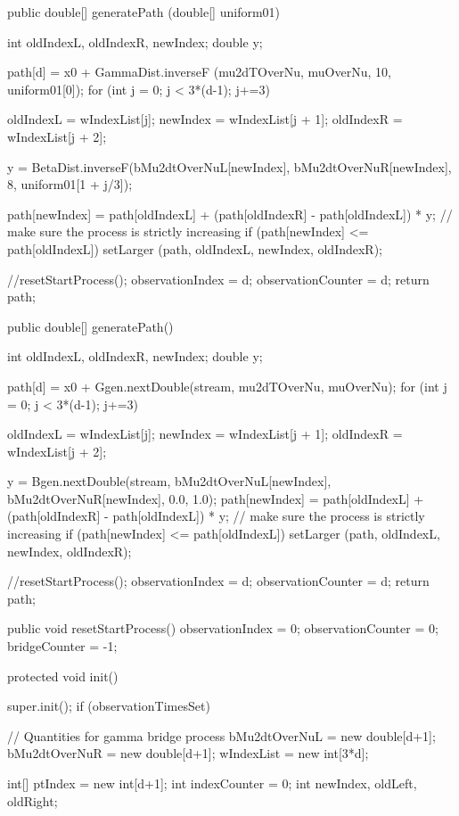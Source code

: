 \begin{code}
\begin{hide}
   public double[] generatePath (double[] uniform01) {
        int oldIndexL, oldIndexR, newIndex;
        double y;

        path[d] = x0 + GammaDist.inverseF (mu2dTOverNu, muOverNu, 10, uniform01[0]);
        for (int j = 0; j < 3*(d-1); j+=3) {
            oldIndexL   = wIndexList[j];
            newIndex    = wIndexList[j + 1];
            oldIndexR   = wIndexList[j + 2];

            y = BetaDist.inverseF(bMu2dtOverNuL[newIndex], bMu2dtOverNuR[newIndex], 8, uniform01[1 + j/3]);

            path[newIndex] = path[oldIndexL] +
              (path[oldIndexR] - path[oldIndexL]) * y;
            // make sure the process is strictly increasing
            if (path[newIndex] <= path[oldIndexL])
               setLarger (path, oldIndexL, newIndex, oldIndexR);
        }
        //resetStartProcess();
        observationIndex   = d;
        observationCounter = d;
        return path;
    }

    public double[] generatePath() {
        int oldIndexL, oldIndexR, newIndex;
        double y;

        path[d] = x0 + Ggen.nextDouble(stream, mu2dTOverNu, muOverNu);
        for (int j = 0; j < 3*(d-1); j+=3) {
            oldIndexL   = wIndexList[j];
            newIndex    = wIndexList[j + 1];
            oldIndexR   = wIndexList[j + 2];

            y = Bgen.nextDouble(stream, bMu2dtOverNuL[newIndex], bMu2dtOverNuR[newIndex], 0.0, 1.0);
            path[newIndex] = path[oldIndexL] +
              (path[oldIndexR] - path[oldIndexL]) * y;
           // make sure the process is strictly increasing
           if (path[newIndex] <= path[oldIndexL])
               setLarger (path, oldIndexL, newIndex, oldIndexR);
        }
        //resetStartProcess();
        observationIndex   = d;
        observationCounter = d;
        return path;
    }

   public void resetStartProcess() {
        observationIndex   = 0;
        observationCounter = 0;
        bridgeCounter = -1;
    }

   protected void init() {
        super.init();
        if (observationTimesSet) {

        // Quantities for gamma bridge process
        bMu2dtOverNuL = new double[d+1];
        bMu2dtOverNuR = new double[d+1];
        wIndexList  = new int[3*d];

        int[] ptIndex = new int[d+1];
        int   indexCounter = 0;
        int   newIndex, oldLeft, oldRight;

}}
\end{hide}
\end{code}
